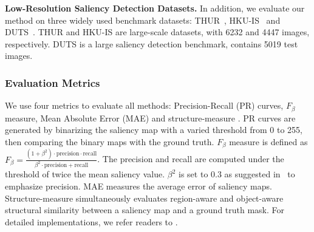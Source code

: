 \documentclass[10pt,twocolumn,letterpaper]{article}
\begin{document}
\noindent\textbf{Low-Resolution Saliency Detection Datasets.} In addition, we evaluate our method on three widely used benchmark datasets:
THUR~\cite{cheng2014salientshape}, HKU-IS~\cite{li2015visual} and DUTS~\cite{wang2017}. THUR and HKU-IS are large-scale datasets, with 6232 and 4447 images, respectively. DUTS is a large saliency detection benchmark, contains 5019 test images.
\subsubsection{Evaluation Metrics}
We use four metrics to evaluate all methods: Precision-Recall (PR) curves, $F_\beta$ measure, Mean Absolute Error (MAE) and structure-measure \cite{fan2017structure}. PR curves are generated by binarizing the saliency map with a varied threshold from 0 to 255, then comparing the binary maps with the ground truth. $F_\beta$ measure is defined as ${F_\beta } = \frac{{\left( {1 + {\beta ^2}} \right) \cdot \text{precision} \cdot \text{recall}}}{{{\beta ^2} \cdot \text{precision} + \text{recall}}}$. The precision and recall are computed under the threshold of twice the mean saliency value. $\beta^2$ is set to 0.3 as suggested in~\cite{achanta2009frequency} to emphasize precision. MAE measures the average error of saliency maps. Structure-measure simultaneously evaluates region-aware and object-aware structural similarity between a saliency map and a ground truth mask. For detailed implementations, we refer readers to \cite{fan2017structure}.
\end{document}
